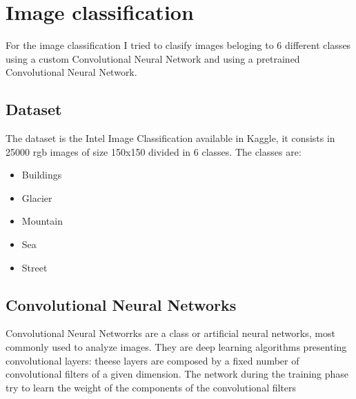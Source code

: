 \documentclass[12pt,journal,compsoc]{IEEEtran}
\begin{document}
\section{Image classification}
For the image classification I tried to clasify images beloging to 6 different classes using a custom Convolutional Neural Network and using a pretrained Convolutional Neural Network.
\subsection{Dataset}
The dataset is the Intel Image Classification available in Kaggle, it consists in 25000 rgb images of size 150x150 divided in 6 classes.
The classes are:
\begin{itemize}
	\item Buildings
	\item Glacier
	\item Mountain
	\item Sea 
	\item Street
\end{itemize}
\subsection{Convolutional Neural Networks}
Convolutional Neural Networrks are a class or artificial neural networks, most commonly used to analyze images\cite{CNNs}.
They are deep learning algorithms presenting convolutional layers: theese layers are composed by a fixed number of convolutional filters of a given dimension. The network during the training phase try to learn the weight of the components of the convolutional filters
\end{document}
